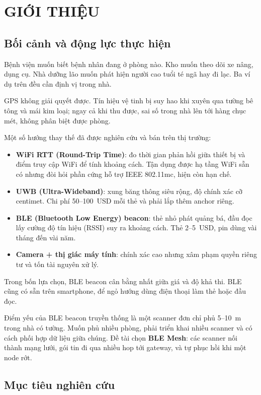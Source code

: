 \chapter{GIỚI THIỆU}
\label{Chapter1}

\section{Bối cảnh và động lực thực hiện}

Bệnh viện muốn biết bệnh nhân đang ở phòng nào. Kho muốn theo dõi xe nâng, dụng cụ. Nhà dưỡng lão muốn phát hiện người cao tuổi té ngã hay đi lạc. Ba ví dụ trên đều cần định vị trong nhà.

GPS không giải quyết được. Tín hiệu vệ tinh bị suy hao khi xuyên qua tường bê tông và mái kim loại; ngay cả khi thu được, sai số trong nhà lên tới hàng chục mét, không phân biệt được phòng.

Một số hướng thay thế đã được nghiên cứu và bán trên thị trường:

\begin{itemize}
    \item \textbf{WiFi RTT (Round-Trip Time)}: đo thời gian phản hồi giữa thiết bị và điểm truy cập WiFi để tính khoảng cách. Tận dụng được hạ tầng WiFi sẵn có nhưng đòi hỏi phần cứng hỗ trợ IEEE 802.11mc, hiện còn hạn chế.
    \item \textbf{UWB (Ultra-Wideband)}: xung băng thông siêu rộng, độ chính xác cỡ centimet. Chi phí 50--100~USD mỗi thẻ và phải lắp thêm anchor riêng.
    \item \textbf{BLE (Bluetooth Low Energy) beacon}: thẻ nhỏ phát quảng bá, đầu đọc lấy cường độ tín hiệu (RSSI) suy ra khoảng cách. Thẻ 2--5~USD, pin dùng vài tháng đến vài năm.
    \item \textbf{Camera + thị giác máy tính}: chính xác cao nhưng xâm phạm quyền riêng tư và tốn tài nguyên xử lý.
\end{itemize}

Trong bốn lựa chọn, BLE beacon cân bằng nhất giữa giá và độ khả thi. BLE cũng có sẵn trên smartphone, để ngỏ hướng dùng điện thoại làm thẻ hoặc đầu đọc.

Điểm yếu của BLE beacon truyền thống là một scanner đơn chỉ phủ 5--10~m trong nhà có tường. Muốn phủ nhiều phòng, phải triển khai nhiều scanner và có cách phối hợp dữ liệu giữa chúng. Đề tài chọn \textbf{BLE Mesh}: các scanner nối thành mạng lưới, gói tin đi qua nhiều hop tới gateway, và tự phục hồi khi một node rớt.

\section{Mục tiêu nghiên cứu}

